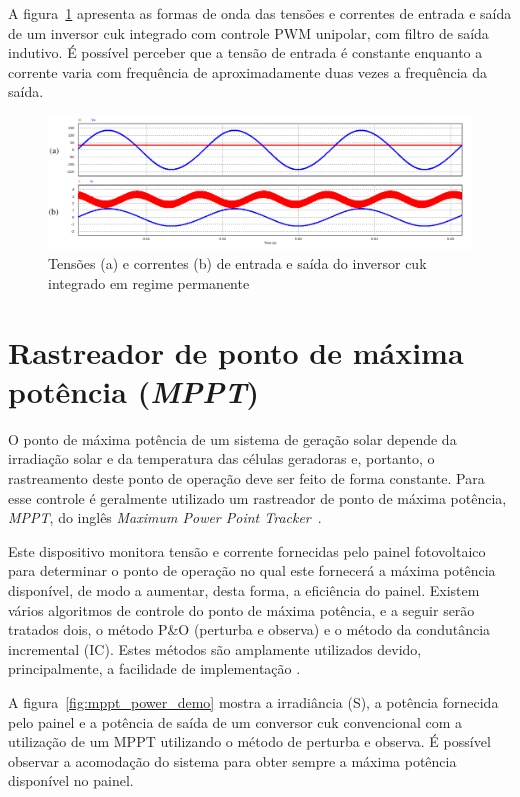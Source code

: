 \documentclass[
	12pt,				%
	openright,			%
	twoside,			%
	a4paper,			%
	english,			%
	french,				%
	spanish,			%
	brazil,				%
	]{abntex2}
\begin{document}
A figura~\ref{fig:integ_cuk_In_Out_zoom} apresenta as formas de onda das tensões e correntes de entrada e saída de um inversor cuk integrado com controle PWM unipolar, com filtro de saída indutivo. É possível perceber que a tensão de entrada é constante enquanto a corrente varia com frequência de aproximadamente duas vezes a frequência da saída.

\begin{figure}[htb]
	\centering
		\includegraphics[width= \linewidth]{cuk_integ_In_Out_zoom_2}
		\caption{Tensões (a) e correntes (b) de entrada e saída do inversor cuk integrado em regime permanente}
		\label{fig:integ_cuk_In_Out_zoom}
\end{figure}


\section{Rastreador de ponto de máxima potência (\textit{MPPT})}

O ponto de máxima potência de um sistema de geração solar depende da irradiação solar e da temperatura das células geradoras e, portanto, o rastreamento deste ponto de operação deve ser feito de forma constante. Para esse controle é geralmente utilizado um rastreador de ponto de máxima potência, \emph{MPPT}, do inglês \textit{Maximum Power Point Tracker}~\cite{Talha_MPPT}. 

Este dispositivo monitora tensão e corrente fornecidas pelo painel fotovoltaico para determinar o ponto de operação no qual este fornecerá a máxima potência disponível, de modo a aumentar, desta forma, a eficiência do painel. Existem vários algoritmos de controle do ponto de máxima potência, e a seguir serão tratados dois, o método P\&O (perturba e observa) e o método da condutância incremental (IC). Estes métodos são amplamente utilizados devido, principalmente, a facilidade de implementação \cite{MPPT_P&O_IC}\cite{Talha_MPPT}.

A figura~\ref{fig:mppt_power_demo} mostra a irradiância (S), a potência fornecida pelo painel e a potência de saída de um conversor cuk convencional com a utilização de um MPPT utilizando o método de perturba e observa. É possível observar a acomodação do sistema para obter sempre a máxima potência disponível no painel.   
\end{document}
